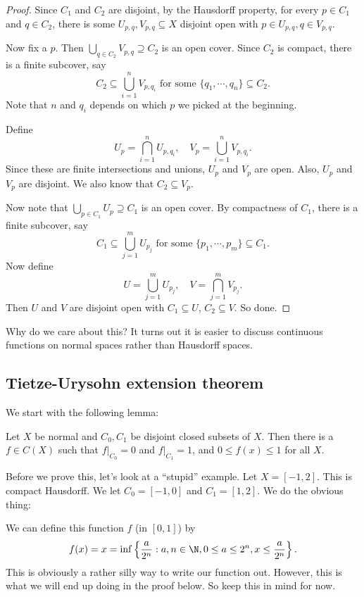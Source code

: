 \documentclass[a4paper]{article}
\begin{document}
\begin{proof}
  Since $C_1$ and $C_2$ are disjoint, by the Hausdorff property, for every $p \in C_1$ and $q \in C_2$, there is some $U_{p, q}, V_{p, q}\subseteq X$ disjoint open with $p \in U_{p, q}, q \in V_{p, q}$.

  Now fix a $p$. Then $\bigcup_{q \in C_2}V_{p, q}\supseteq C_2$ is an open cover. Since $C_2$ is compact, there is a finite subcover, say
  \[
    C_2 \subseteq \bigcup_{i = 1}^n V_{p, q_i}\text{ for some }\{q_1,\cdots, q_n\}\subseteq C_2.
  \]
  Note that $n$ and $q_i$ depends on which $p$ we picked at the beginning.

  Define
  \[
    U_p = \bigcap_{i=1}^n U_{p, q_i},\quad V_p = \bigcup_{i = 1}^n V_{p, q_i}.
  \]
  Since these are finite intersections and unions, $U_p$ and $V_p$ are open. Also, $U_p$ and $V_p$ are disjoint. We also know that $C_2 \subseteq V_p$.

  Now note that $\bigcup_{p \in C_1} U_p \supseteq C_1$ is an open cover. By compactness of $C_1$, there is a finite subcover, say
  \[
    C_1 \subseteq \bigcup_{j = 1}^m U_{p_j}\text{ for some }\{p_1, \cdots, p_m\}\subseteq C_1.
  \]
  Now define
  \[
    U = \bigcup_{j = 1}^m U_{p_j},\quad V = \bigcap_{j = 1}^m V_{p_j}.
  \]
  Then $U$ and $V$ are disjoint open with $C_1 \subseteq U$, $C_2 \subseteq V$. So done.
\end{proof}
Why do we care about this? It turns out it is easier to discuss continuous functions on normal spaces rather than Hausdorff spaces.

\subsection{Tietze-Urysohn extension theorem}
We start with the following lemma:
\begin{lemma}
  Let $X$ be normal and $C_0, C_1$ be disjoint closed subsets of $X$. Then there is a $f \in C(X)$ such that $f|_{C_0} = 0$ and $f|_{C_1} = 1$, and $0 \leq f(x) \leq 1$ for all $X$.
\end{lemma}
Before we prove this, let's look at a ``stupid'' example. Let $X = [-1, 2]$. This is compact Hausdorff. We let $C_0 = [-1, 0]$ and $C_1 = [1, 2]$. We do the obvious thing:
\begin{center}
\end{center}
We can define this function $f$ (in $[0, 1]$) by
\[
  f(x) = x = \inf\left\{\frac{a}{2^n}: a, n \in \N, 0 \leq a \leq 2^n, x \leq \frac{a}{2^n}\right\}.
\]
This is obviously a rather silly way to write our function out. However, this is what we will end up doing in the proof below. So keep this in mind for now.
\end{document}

